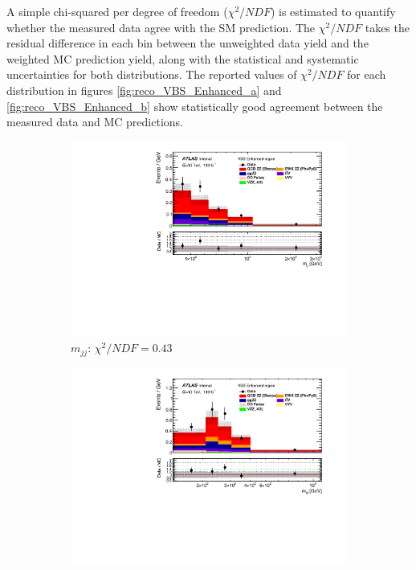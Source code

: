A simple chi-squared per degree of freedom ($\chi^2/NDF$) is estimated to quantify whether the measured data agree with the SM prediction. The $\chi^2/NDF$ takes the residual difference in each bin between the unweighted data yield and the weighted MC prediction yield, along with the statistical and systematic uncertainties for both distributions. The reported values of $\chi^2/NDF$ for each distribution in figures \ref{fig:reco_VBS_Enhanced_a} and \ref{fig:reco_VBS_Enhanced_b} show statistically good agreement between the measured data and MC predictions. 

\begin{figure}[!htb]
    \centering
    \begin{subfigure}{.49\textwidth}
        \centering
        \includegraphics[width=.98\linewidth]{figures/Results/RecoDist_VBSEnhanced/reco_mjj_SR.pdf}
        \caption{ \footnotesize{$m_{jj}$}: $\chi^2/NDF = 0.43$ }
    \end{subfigure}
    \begin{subfigure}{.49\textwidth}
        \centering
        \includegraphics[width=.98\linewidth]{figures/Results/RecoDist_VBSEnhanced/reco_m4l_SR.pdf}

\end{subfigure}
\end{figure}
